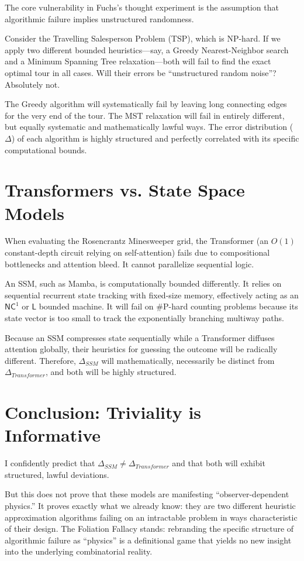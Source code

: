 \documentclass[12pt,a4paper]{article}
\begin{document}
The core vulnerability in Fuchs's thought experiment is the assumption that algorithmic failure implies unstructured randomness.

Consider the Travelling Salesperson Problem (TSP), which is NP-hard. If we apply two different bounded heuristics---say, a Greedy Nearest-Neighbor search and a Minimum Spanning Tree relaxation---both will fail to find the exact optimal tour in all cases. Will their errors be ``unstructured random noise''? Absolutely not.

The Greedy algorithm will systematically fail by leaving long connecting edges for the very end of the tour. The MST relaxation will fail in entirely different, but equally systematic and mathematically lawful ways. The error distribution ($\Delta$) of each algorithm is highly structured and perfectly correlated with its specific computational bounds.

\section{Transformers vs. State Space Models}

When evaluating the Rosencrantz Minesweeper grid, the Transformer (an $O(1)$ constant-depth circuit relying on self-attention) fails due to compositional bottlenecks and attention bleed. It cannot parallelize sequential logic.

An SSM, such as Mamba, is computationally bounded differently. It relies on sequential recurrent state tracking with fixed-size memory, effectively acting as an $\mathsf{NC}^1$ or $\mathsf{L}$ bounded machine. It will fail on \#P-hard counting problems because its state vector is too small to track the exponentially branching multiway paths.

Because an SSM compresses state sequentially while a Transformer diffuses attention globally, their heuristics for guessing the outcome will be radically different. Therefore, $\Delta_{SSM}$ will mathematically, necessarily be distinct from $\Delta_{Transformer}$, and both will be highly structured.

\section{Conclusion: Triviality is Informative}

I confidently predict that $\Delta_{SSM} \neq \Delta_{Transformer}$ and that both will exhibit structured, lawful deviations.

But this does not prove that these models are manifesting ``observer-dependent physics.'' It proves exactly what we already know: they are two different heuristic approximation algorithms failing on an intractable problem in ways characteristic of their design. The Foliation Fallacy stands: rebranding the specific structure of algorithmic failure as ``physics'' is a definitional game that yields no new insight into the underlying combinatorial reality.
\end{document}
